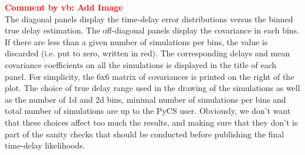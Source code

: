 \documentclass[11pt]{scrartcl}
\newcommand{\com}[2]{\xspace\textcolor{red}{\textbf{Comment by #1: #2}}}
\begin{document}
\com{vb}{Add Image}\\

The diagonal panels display the time-delay error distributions versus 
the binned true delay estimation. The off-diagonal panels display the 
covariance in each bins. If there are less than a given number of 
simulations per 
bins, the value is discarded (i.e. put to zero, written in red). The 
corresponding delays and mean covariance coefficients on all the 
simulations is 
displayed in the title of each panel. For simplicity, the 6x6 matrix of 
covariances is printed on the right of the plot. The choice of true 
delay range used in the drawing of the simulations as well as the 
number of 1d and 2d bins, minimal 
number of simulations per bins and total number of simulations are 
up to the PyCS user. Obviously, we don't want that these choices 
affect too much the results, and making sure that they don't is part of 
the sanity checks that should be conducted before publishing the final 
time-delay likelihoods.
\end{document}
